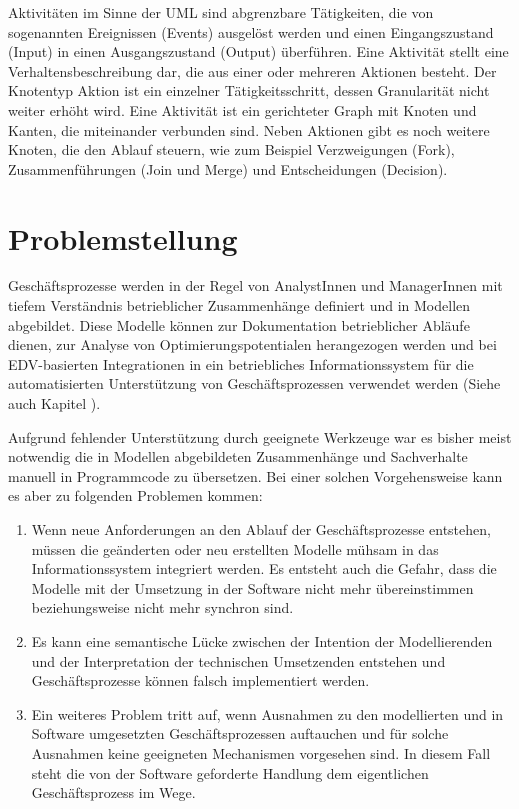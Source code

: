 Aktivitäten im Sinne der UML sind abgrenzbare Tätigkeiten, die von sogenannten Ereignissen (Events) ausgelöst werden und einen Eingangszustand (Input) in einen Ausgangszustand (Output) überführen. Eine Aktivität stellt eine Verhaltensbeschreibung dar, die aus einer oder mehreren Aktionen besteht. Der Knotentyp Aktion ist ein einzelner Tätigkeitsschritt, dessen Granularität nicht weiter erhöht wird. Eine Aktivität ist ein gerichteter Graph mit Knoten und Kanten, die miteinander verbunden sind. Neben Aktionen gibt es noch weitere Knoten, die den Ablauf steuern, wie zum Beispiel Verzweigungen (Fork), Zusammenführungen (Join und Merge) und Entscheidungen (Decision). %


\section{Problemstellung}
Geschäftsprozesse werden in der Regel von AnalystInnen und ManagerInnen mit tiefem Verständnis betrieblicher Zusammenhänge definiert und in Modellen abgebildet. Diese Modelle können zur Dokumentation betrieblicher Abläufe dienen, zur Analyse von Optimierungspotentialen herangezogen werden und bei EDV-basierten Integrationen in ein betriebliches Informationssystem für die automatisierten Unterstützung von Geschäftsprozessen verwendet werden (Siehe auch Kapitel ).

Aufgrund fehlender Unterstützung durch geeignete Werkzeuge war es bisher meist notwendig die in Modellen abgebildeten Zusammenhänge und Sachverhalte manuell in Programmcode zu übersetzen. Bei einer solchen Vorgehensweise kann es aber zu folgenden Problemen kommen:

\begin{enumerate}
\item Wenn neue Anforderungen an den Ablauf der Geschäftsprozesse entstehen, müssen die geänderten oder neu erstellten Modelle mühsam in das Informationssystem integriert werden. Es entsteht auch die Gefahr, dass die Modelle mit der Umsetzung in der Software nicht mehr übereinstimmen beziehungsweise nicht mehr synchron sind.
\item Es kann eine semantische Lücke zwischen der Intention der Modellierenden und der Interpretation der technischen Umsetzenden entstehen und Geschäftsprozesse können falsch implementiert werden.
\item Ein weiteres Problem tritt auf, wenn Ausnahmen zu den modellierten und in Software umgesetzten Geschäftsprozessen auftauchen und für solche Ausnahmen keine geeigneten Mechanismen vorgesehen sind. In diesem Fall steht die von der Software geforderte Handlung dem eigentlichen Geschäftsprozess im Wege.
\end{enumerate}

